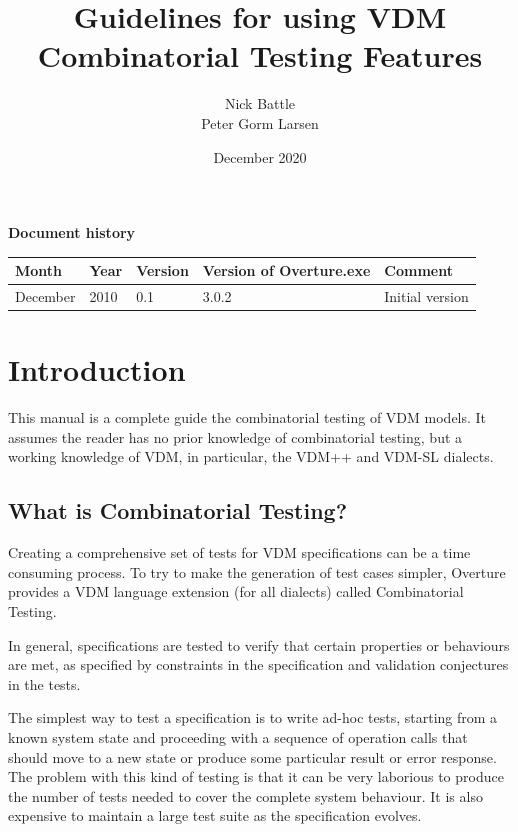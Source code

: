 \documentclass{overturerepchap}
\begin{document}
\title{Guidelines for using VDM Combinatorial Testing Features}
\author{Nick Battle\\
            Peter Gorm Larsen}

\date{December 2020}

\maketitle


{\textbf{Document history}}

\begin{tabular}{|l|l|l|l|l|}\hline
Month   & Year & Version & Version of Overture.exe & Comment \\ \hline
December   & 2010 &    0.1     & 3.0.2   & Initial version\\ \hline
\end{tabular}

\tableofcontents
\newpage
\mbox{}
\newpage
{}
\setcounter{page}{1}

\chapter{Introduction}

This manual is a complete guide the combinatorial testing of VDM models. It
assumes the reader has no prior knowledge of combinatorial testing, but a
working knowledge of VDM, in particular, the VDM++ and VDM-SL dialects.

\section{What is Combinatorial Testing?}

Creating a comprehensive set of tests for VDM specifications can be a time
consuming process. To try to make the generation of test cases simpler, Overture
provides a VDM language extension (for all dialects) called Combinatorial
Testing.

In general, specifications are tested to verify that certain properties or
behaviours are met, as specified by constraints in the specification and
validation conjectures in the tests.

The simplest way to test a specification is to write ad-hoc tests, starting from
a known system state and proceeding with a sequence of operation calls that
should move to a new state or produce some particular result or error response.
The problem with this kind of testing is that it can be very laborious to produce
the number of tests needed to cover the complete system behaviour. It is also
expensive to maintain a large test suite as the specification evolves.
\end{document}
